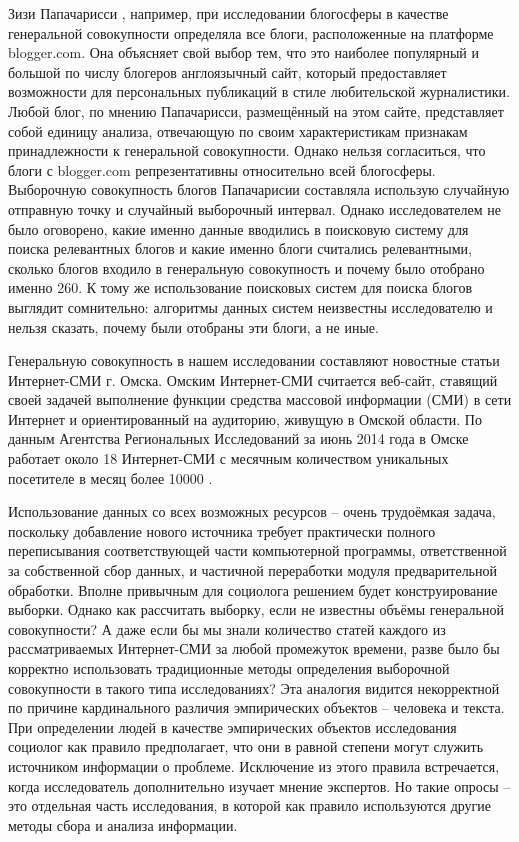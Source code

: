 Зизи Папачарисси \cite{zizi}, например, при исследовании блогосферы в качестве генеральной совокупности определяла все блоги, расположенные на платформе blogger.com. Она объясняет свой выбор тем, что это наиболее популярный и большой по числу блогеров англоязычный сайт, который предоставляет возможности для персональных публикаций в стиле любительской журналистики. Любой блог, по мнению Папачарисси, размещённый на этом сайте, представляет собой единицу анализа, отвечающую по своим характеристикам признакам принадлежности к генеральной совокупности. Однако нельзя согласиться, что блоги с blogger.com репрезентативны относительно всей блогосферы. Выборочную совокупность блогов Папачарисии составляла использую случайную отправную точку и случайный выборочный интервал. Однако исследователем не было оговорено, какие именно данные вводились в поисковую систему для поиска релевантных блогов и какие именно блоги считались релевантными, сколько блогов входило в генеральную совокупность и почему было отобрано именно 260. К тому же использование поисковых систем для поиска блогов выглядит сомнительно: алгоритмы данных систем неизвестны исследователю и нельзя сказать, почему были отобраны эти блоги, а не иные.

Генеральную совокупность в нашем исследовании составляют новостные статьи Интернет-СМИ г. Омска. Омским Интернет-СМИ считается веб-сайт, ставящий своей задачей выполнение функции средства массовой информации (СМИ) в сети Интернет и ориентированный на аудиторию, живущую в Омской области. По данным Агентства Региональных Исследований за июнь 2014 года в Омске работает около 18 Интернет-СМИ с месячным количеством уникальных посетителе в месяц более 10000 \cite{ari_rating}.

Использование данных со всех возможных ресурсов -- очень трудоёмкая задача, поскольку добавление нового источника требует практически полного переписывания соответствующей части компьютерной программы, ответственной за собственной сбор данных, и частичной переработки модуля предварительной обработки. Вполне привычным для социолога решением будет конструирование выборки. Однако как рассчитать выборку, если не известны объёмы генеральной совокупности? А даже если бы мы знали количество статей каждого из рассматриваемых Интернет-СМИ за любой промежуток времени, разве было бы корректно использовать традиционные методы определения выборочной совокупности в такого типа исследованиях? Эта аналогия видится некорректной по причине кардинального различия эмпирических объектов -- человека и текста. При определении людей в качестве эмпирических объектов исследования социолог как правило предполагает, что они в равной степени могут служить источником информации о проблеме. Исключение из этого правила встречается, когда исследователь дополнительно изучает мнение экспертов. Но такие опросы -- это отдельная часть исследования, в которой как правило используются другие методы сбора и анализа информации.

